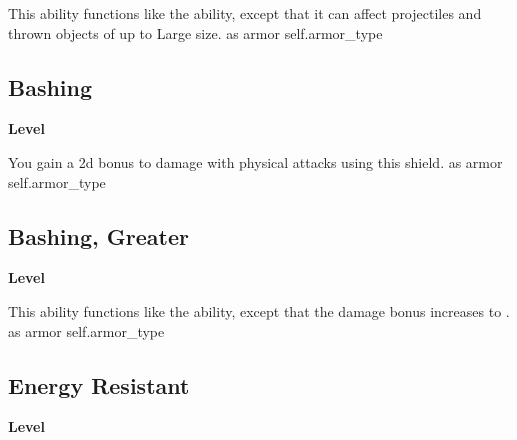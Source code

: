 \vspace{-1.5em}  %
This ability functions like the  ability, except that it can affect projectiles and thrown objects of up to Large size.
 
 as armor
 {self.armor_type}
\begin{multicols}{2}
\lowercase{\hypertarget{item:Bashing}{}}\label{item:Bashing}
\hypertarget{item:Bashing}{\subsection{Bashing}}
\columnbreak%
\begin{flushright}
\large\textbf{ Level}
\end{flushright}
\end{multicols}
\vspace{-1.5em}  %
You gain a \plus2d bonus to damage with physical attacks using this shield.
 
 as armor
 {self.armor_type}
\begin{multicols}{2}
\lowercase{\hypertarget{item:Bashing, Greater}{}}\label{item:Bashing, Greater}
\hypertarget{item:Bashing, Greater}{\subsection{Bashing, Greater}}
\columnbreak%
\begin{flushright}
\large\textbf{ Level}
\end{flushright}
\end{multicols}
\vspace{-1.5em}  %
This ability functions like the  ability, except that the damage bonus increases to .
 
 as armor
 {self.armor_type}
\begin{multicols}{2}
\lowercase{\hypertarget{item:Energy Resistant}{}}\label{item:Energy Resistant}
\hypertarget{item:Energy Resistant}{\subsection{Energy Resistant}}
\columnbreak%
\begin{flushright}
\large\textbf{ Level}
\end{flushright}
\end{multicols}

